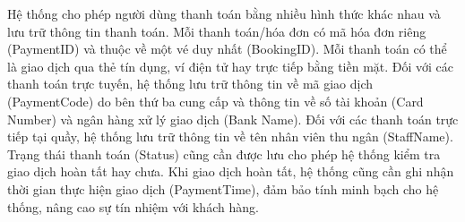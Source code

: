 \documentclass[a4paper]{article}
\begin{document}
Hệ thống cho phép người dùng thanh toán bằng nhiều hình thức khác nhau và lưu trữ thông tin thanh toán. 
Mỗi thanh toán/hóa đơn có mã hóa đơn riêng (PaymentID) và thuộc về một vé duy nhất (BookingID). 
Mỗi thanh toán có thể là giao dịch qua thẻ tín dụng, ví điện tử hay trực tiếp bằng tiền mặt. 
Đối với các thanh toán trực tuyến, hệ thống lưu trữ thông tin về mã giao dịch (PaymentCode) do bên thứ ba cung cấp và thông tin về số tài khoản (Card Number) và ngân hàng xử lý giao dịch (Bank Name). 
Đối với các thanh toán trực tiếp tại quầy, hệ thống lưu trữ thông tin về tên nhân viên thu ngân (StaffName). 
Trạng thái thanh toán (Status) cũng cần được lưu cho phép hệ thống kiểm tra giao dịch hoàn tất hay chưa. 
Khi giao dịch hoàn tất, hệ thống cũng cần ghi nhận thời gian thực hiện giao dịch (PaymentTime), đảm bảo tính minh bạch cho hệ thống, nâng cao sự tín nhiệm với khách hàng.
\end{document}
